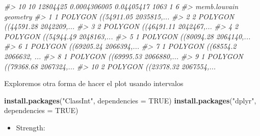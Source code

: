 \documentclass[
]{book}
\newenvironment{Shaded}{\begin{snugshade}}{\end{snugshade}}
\newcommand{\AttributeTok}[1]{\textcolor[rgb]{0.13,0.29,0.53}{#1}}
\newcommand{\CommentTok}[1]{\textcolor[rgb]{0.56,0.35,0.01}{\textit{#1}}}
\newcommand{\ConstantTok}[1]{\textcolor[rgb]{0.56,0.35,0.01}{#1}}
\newcommand{\FunctionTok}[1]{\textcolor[rgb]{0.13,0.29,0.53}{\textbf{#1}}}
\newcommand{\NormalTok}[1]{#1}
\newcommand{\StringTok}[1]{\textcolor[rgb]{0.31,0.60,0.02}{#1}}
\providecommand{\tightlist}{%
  \setlength{\itemsep}{0pt}\setlength{\parskip}{0pt}}
\begin{document}
\begin{Shaded}
\begin{Highlighting}[]
\CommentTok{\#\textgreater{} 10 10 12804425 0.0004306005 0.04405417 1063       1       6}
\CommentTok{\#\textgreater{}    memb.louvain                       geometry}
\CommentTok{\#\textgreater{} 1             1 POLYGON ((54911.05 2035815,...}
\CommentTok{\#\textgreater{} 2             2 POLYGON ((44591.28 2042209,...}
\CommentTok{\#\textgreater{} 3             2 POLYGON ((46491.11 2042467,...}
\CommentTok{\#\textgreater{} 4             2 POLYGON ((54944.49 2048163,...}
\CommentTok{\#\textgreater{} 5             1 POLYGON ((80094.28 2064140,...}
\CommentTok{\#\textgreater{} 6             1 POLYGON ((69205.24 2066394,...}
\CommentTok{\#\textgreater{} 7             1 POLYGON ((68554.2 2066632, ...}
\CommentTok{\#\textgreater{} 8             1 POLYGON ((69995.53 2066880,...}
\CommentTok{\#\textgreater{} 9             1 POLYGON ((79368.68 2067324,...}
\CommentTok{\#\textgreater{} 10            2 POLYGON ((23378.32 2067554,...}
\end{Highlighting}
\end{Shaded}

Exploremos otra forma de hacer el plot usando intervalos

\begin{Shaded}
\begin{Highlighting}[]
\FunctionTok{install.packages}\NormalTok{(}\StringTok{"ClassInt"}\NormalTok{, }\AttributeTok{dependencies =} \ConstantTok{TRUE}\NormalTok{)}
\FunctionTok{install.packages}\NormalTok{(}\StringTok{"dplyr"}\NormalTok{, }\AttributeTok{dependencies =} \ConstantTok{TRUE}\NormalTok{)}
\end{Highlighting}
\end{Shaded}

\begin{itemize}
\tightlist
\item
  Strength:
\end{itemize}
\end{document}
